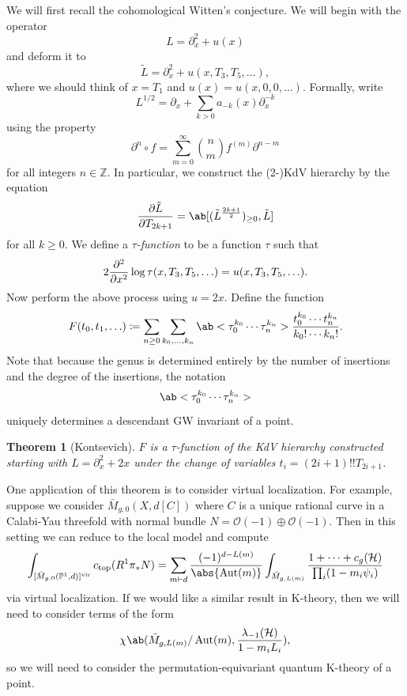 \documentclass{amsart}
\newtheorem{thm}{Theorem}[section]
\theoremstyle{definition}
\theoremstyle{remark}
\theoremstyle{plain}
\theoremstyle{definition}
\theoremstyle{remark}
\newcommand{\Z}{\mathbb{Z}}
\renewcommand{\P}{\mathbb{P}}
\newcommand{\mc}[1]{\mathcal{#1}}
\newcommand{\mr}[1]{\mathrm{#1}}
\newcommand{\1}{\mathbf{1}}
\newcommand{\2}{\mathbf{2}}
\newcommand{\3}{\mathbf{3}}
\newcommand{\vir}{\mr{vir}}
\DeclareMathOperator{\Aut}{Aut}
\begin{document}
We will first recall the cohomological Witten's conjecture. We will begin with the operator
\[ L = \partial_x^2 + u(x) \]
and deform it to
\[ \tilde{L} = \partial_x^2 + u(x, T_3, T_5, \ldots), \]
where we should think of \(x = T_1\) and \(u(x) = u(x, 0, 0,\ldots)\). Formally, write
\[ L^{1/2} = \partial_x + \sum_{k > 0} a_{-k}(x) \partial_x^{-k} \]
using the property
\[ \partial^n \circ f = \sum_{m = 0}^{\infty} \binom{n}{m} f^{(m)} \partial^{n-m} \]
for all integers \(n \in \Z\). In particular, we construct the (2-)KdV hierarchy by the equation
\[ \pdv{\tilde{L}}{T_{2k+1}} = \ab[(\tilde{L}^{\frac{2k+1}{2}})_{\geq 0}, \tilde{L}] \]
for all \(k \geq 0\). We define a \textit{\(\tau\)-function} to be a function \(\tau\) such that 
\[ 2 \pdv[2]{}{x}\log \tau(x, T_3, T_5, \ldots) = u(x, T_3, T_5, \ldots). \]
Now perform the above process using \(u = 2x\). Define the function
\[ F(t_0, t_1, \ldots) \coloneqq \sum_{n \geq 0} \sum_{k_0, \ldots, k_n} \ab<\tau_0^{k_0} \cdots \tau_n^{k_n}> \frac{t_0^{k_0} \cdots t_n^{k_n}}{k_0! \cdots k_n!}. \]
Note that because the genus is determined entirely by the number of insertions and the degree of the insertions, the notation
\[ \ab<\tau_0^{k_0} \cdots \tau_n^{k_n}> \]
uniquely determines a descendant GW invariant of a point.

\begin{thm}[Kontsevich]
    \(F\) is a \(\tau\)-function of the KdV hierarchy constructed starting with \(L = \partial_x^2 + 2x\) under the change of variables \(t_i = (2i+1)!! T_{2i+1}\).
\end{thm}

One application of this theorem is to consider virtual localization. For example, suppose we consider \(\bar{M}_{g,0}(X, d[C])\) where \(C\) is a unique rational curve in a Calabi-Yau threefold with normal bundle \(N = \mc{O}(-1)\oplus \mc{O}(-1)\). Then in this setting we can reduce to the local model and compute
\begin{align*}
    \int_{[\bar{M}_{g,0}(\P^1, d)]^{\vir}} c_{\mr{top}}(R^1 \pi_* N) = \sum_{m \vdash d} \frac{(-1)^{d-L(m)}}{\abs{\Aut(m)}} \int_{\bar{M}_{g, L(m)}} \frac{1 + \cdots + c_g(\mc{H})}{\prod_i (1-m_i \psi_i)}
\end{align*}
via virtual localization. If we would like a similar result in K-theory, then we will need to consider terms of the form
\[ \chi\ab(\bar{M}_{g, L(m)}/\Aut(m), \frac{\lambda_{-1}(\mc{H})}{1-m_i L_i}), \]
so we will need to consider the permutation-equivariant quantum K-theory of a point.
\end{document}
